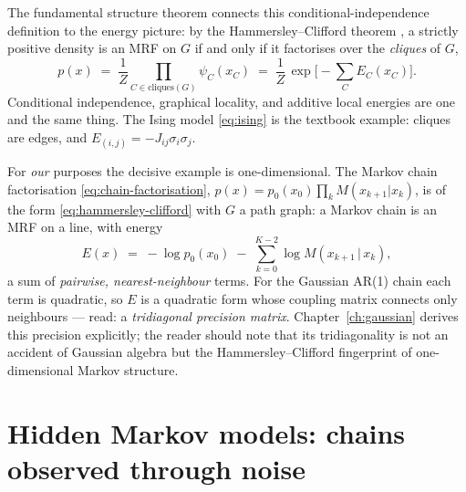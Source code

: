 The fundamental structure theorem connects this conditional-independence
definition to the energy picture: by the Hammersley--Clifford theorem
\citep[proved in][]{besag1974spatial}, a strictly positive density is an MRF
on $G$ if and only if it factorises over the \emph{cliques} of $G$,
\begin{equation}
  p(x) \;=\; \frac{1}{Z} \prod_{C \in \mathrm{cliques}(G)} \psi_C(x_C)
  \;=\; \frac{1}{Z}\, \exp\Big[ -\sum_C E_C(x_C) \Big] .
  \label{eq:hammersley-clifford}
\end{equation}
Conditional independence, graphical locality, and additive local energies
are one and the same thing. The Ising model \eqref{eq:ising} is the textbook
example: cliques are edges, and $E_{(i,j)} = -J_{ij}\sigma_i\sigma_j$.

For \emph{our} purposes the decisive example is one-dimensional. The Markov
chain factorisation \eqref{eq:chain-factorisation},
$p(x) = p_0(x_0) \prod_k M(x_{k+1}|x_k)$, is of the form
\eqref{eq:hammersley-clifford} with $G$ a path graph: a Markov chain is an
MRF on a line, with energy
\begin{equation}
  E(x) \;=\; -\log p_0(x_0) \;-\; \sum_{k=0}^{K-2} \log M(x_{k+1} \,|\, x_k),
  \label{eq:chain-energy}
\end{equation}
a sum of \emph{pairwise, nearest-neighbour} terms. For the Gaussian AR(1)
chain each term is quadratic, so $E$ is a quadratic form whose coupling
matrix connects only neighbours --- read: a \emph{tridiagonal precision
matrix}. Chapter~\ref{ch:gaussian} derives this precision explicitly; the
reader should note that its tridiagonality is not an accident of Gaussian
algebra but the Hammersley--Clifford fingerprint of one-dimensional Markov
structure.

\section{Hidden Markov models: chains observed through noise}
\label{sec:hmm}

